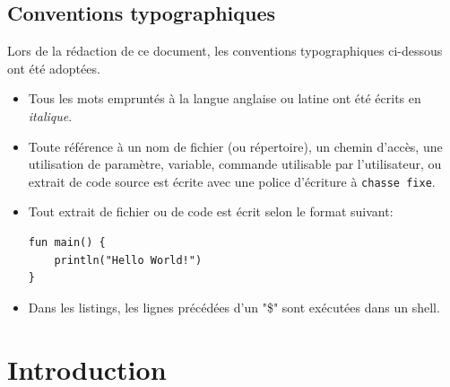 \documentclass[a4paper, 12pt]{article}
\newenvironment{code}{\captionsetup{type=listing}}{}
\begin{document}
\subsection*{Conventions typographiques} %
Lors de la rédaction de ce document, les conventions typographiques ci-dessous ont
été adoptées.
\begin{itemize}[label=\textbullet]
	\item Tous les mots empruntés à la langue anglaise ou latine ont été écrits en \textit{italique}.
	\item Toute référence à un nom de fichier (ou répertoire), un chemin d'accès, une 
    utilisation de paramètre, variable, commande utilisable par l'utilisateur, ou extrait de code 
    source est écrite avec une police d'écriture à \texttt{chasse fixe}.
	\item Tout extrait de fichier ou de code est écrit selon le format suivant:
    \bigbreak
    \begin{code}
        \begin{verbatim}
fun main() {
    println("Hello World!")
}
        \end{verbatim}
    \end{code}
    \item Dans les listings, les lignes précédées d'un "\$" sont exécutées dans un shell.
\end{itemize}


\printglossary[type=\acronymtype,title={Acronymes}]
\newpage


\section{Introduction} %

\newpage
\end{document}

